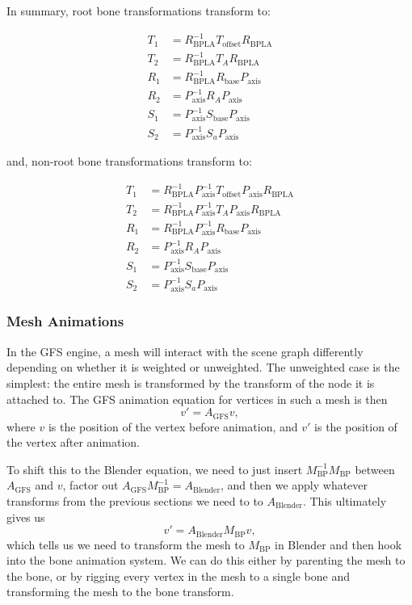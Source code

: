 \documentclass{article}
\begin{document}
In summary, root bone transformations transform to:
\begin{tcolorbox}
\begin{align}
T_1 &= R_\mathrm{BPLA}^{-1} T_\mathrm{offset} R_\mathrm{BPLA}\\
T_2 &= R_\mathrm{BPLA}^{-1} T_A R_\mathrm{BPLA}  \\
R_1 &= R_\mathrm{BPLA}^{-1} R_\mathrm{base} P_\mathrm{axis}\\
R_2 &= P_\mathrm{axis}^{-1} R_A P_\mathrm{axis}\\
S_1 &= P_\mathrm{axis}^{-1} S_\mathrm{base} P_\mathrm{axis}\\
S_2 &= P_\mathrm{axis}^{-1} S_a P_\mathrm{axis}
\end{align}
\end{tcolorbox}
and, non-root bone transformations transform to:
\begin{tcolorbox}
\begin{align}
T_1 &= R_\mathrm{BPLA}^{-1} P_\mathrm{axis}^{-1} T_\mathrm{offset} P_\mathrm{axis} R_\mathrm{BPLA}\\
T_2 &= R_\mathrm{BPLA}^{-1} P_\mathrm{axis}^{-1} T_A P_\mathrm{axis} R_\mathrm{BPLA}  \\
R_1 &= R_\mathrm{BPLA}^{-1} P_\mathrm{axis}^{-1}  R_\mathrm{base} P_\mathrm{axis}\\
R_2 &= P_\mathrm{axis}^{-1} R_A P_\mathrm{axis}\\
S_1 &= P_\mathrm{axis}^{-1} S_\mathrm{base} P_\mathrm{axis}\\
S_2 &= P_\mathrm{axis}^{-1} S_a P_\mathrm{axis}
\end{align}
\end{tcolorbox}


\subsubsection{Mesh Animations}
In the GFS engine, a mesh will interact with the scene graph differently depending on whether it is weighted or unweighted. The unweighted case is the simplest: the entire mesh is transformed by the transform of the node it is attached to. The GFS animation equation for vertices in such a mesh is then
\begin{equation}
v'  = A_\mathrm{GFS} v,
\end{equation}
where $v$ is the position of the vertex before animation, and $v'$ is the position of the vertex after animation. 

To shift this to the Blender equation, we need to just insert $M_\mathrm{BP}^{-1}M_\mathrm{BP}$ between $A_\mathrm{GFS}$ and $v$, factor out $A_\mathrm{GFS}M_\mathrm{BP}^{-1} = A_\mathrm{Blender}$, and then we apply whatever transforms from the previous sections we need to to $A_\mathrm{Blender}$. This ultimately gives us
\begin{equation}
v'  = A_\mathrm{Blender} M_\mathrm{BP} v,
\end{equation}
which tells us we need to transform the mesh to $M_\mathrm{BP}$ in Blender and then hook into the bone animation system. We can do this either by parenting the mesh to the bone, or by rigging every vertex in the mesh to a single bone and transforming the mesh to the bone transform.
\end{document}
